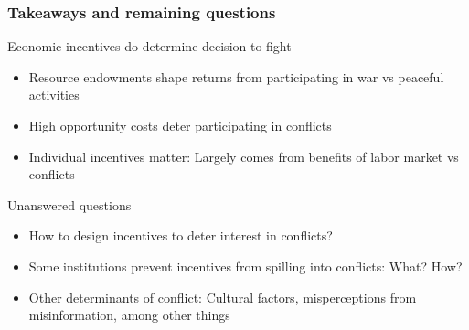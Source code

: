 \documentclass[aspectratio=169]{beamer}
\begin{document}
\begin{frame}
\frametitle{Takeaways and remaining questions} 
Economic incentives do determine decision to fight
\begin{itemize}\setlength\itemsep{3pt}
  \item Resource endowments shape returns from participating in war vs peaceful activities
  \item High opportunity costs deter participating in conflicts
  \item Individual incentives matter: Largely comes from benefits of labor market vs conflicts
\end{itemize} \medskip
Unanswered questions
\begin{itemize}\setlength\itemsep{3pt}
  \item How to design incentives to deter interest in conflicts?
  \item Some institutions prevent incentives from spilling into conflicts: What? How?
  \item Other determinants of conflict: Cultural factors, misperceptions from misinformation, among other things
\end{itemize}
\end{frame}


\end{document}
